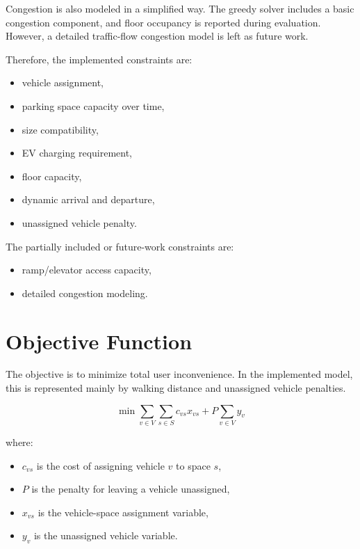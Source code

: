 \documentclass[12pt,a4paper]{article}
\begin{document}
Congestion is also modeled in a simplified way. The greedy solver includes a basic congestion component, and floor occupancy is reported during evaluation. However, a detailed traffic-flow congestion model is left as future work.

Therefore, the implemented constraints are:

\begin{itemize}
    \item vehicle assignment,
    \item parking space capacity over time,
    \item size compatibility,
    \item EV charging requirement,
    \item floor capacity,
    \item dynamic arrival and departure,
    \item unassigned vehicle penalty.
\end{itemize}

The partially included or future-work constraints are:

\begin{itemize}
    \item ramp/elevator access capacity,
    \item detailed congestion modeling.
\end{itemize}

\section{Objective Function}

The objective is to minimize total user inconvenience. In the implemented model, this is represented mainly by walking distance and unassigned vehicle penalties.

\begin{equation}
\min \sum_{v \in V} \sum_{s \in S} c_{vs} x_{vs}
+ P \sum_{v \in V} y_v
\end{equation}

where:

\begin{itemize}
    \item $c_{vs}$ is the cost of assigning vehicle $v$ to space $s$,
    \item $P$ is the penalty for leaving a vehicle unassigned,
    \item $x_{vs}$ is the vehicle-space assignment variable,
    \item $y_v$ is the unassigned vehicle variable.
\end{itemize}
\end{document}
